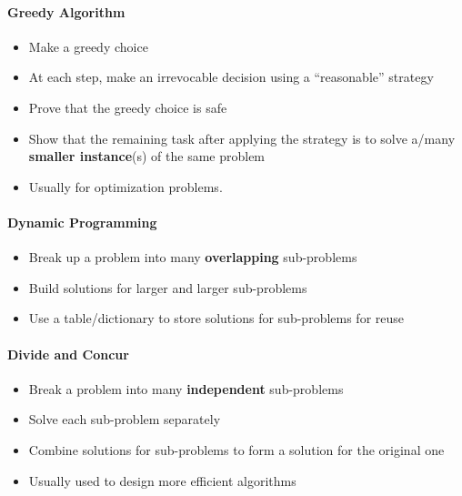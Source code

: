             \paragraph{Greedy Algorithm}
                \begin{itemize}
                    \item Make a greedy choice
                    \item At each step, make an irrevocable decision using a ``reasonable'' strategy
                    \item Prove that the greedy choice is safe
                    \item Show that the remaining task after applying the strategy is to solve a/many \textbf{smaller instance}(s) of the same problem
                    \item Usually for optimization problems.
                \end{itemize}

            \paragraph{Dynamic Programming}
                \begin{itemize}
                    \item Break up a problem into many \textbf{overlapping} sub-problems
                    \item Build solutions for larger and larger sub-problems
                    \item Use a table/dictionary to store solutions for sub-problems for reuse
                \end{itemize}

            \paragraph{Divide and Concur}
                \begin{itemize}
                    \item Break a problem into many \textbf{independent} sub-problems
                    \item Solve each sub-problem separately
                    \item Combine solutions for sub-problems to form a solution for the original one
                    \item Usually used to design more efficient algorithms
                \end{itemize}

